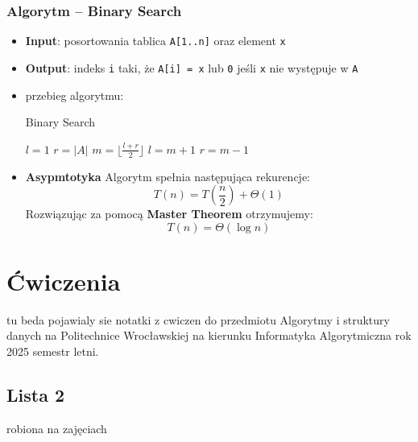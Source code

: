 \documentclass[11pt,a4paper]{article}
\begin{document}
\subsubsection*{Algorytm -- Binary Search}
\begin{itemize}
    \item \textbf{Input}: posortowania tablica \texttt{A[1..n]} oraz element \texttt{x}
    \item \textbf{Output}: indeks \texttt{i} taki, że \texttt{A[i] = x} lub \texttt{0} jeśli \texttt{x} nie występuje w \texttt{A}
        \item przebieg algorytmu: %
            \begin{algorithm}[H]
                \caption{Binary Search}
                \begin{algorithmic}[1]
                        \State $l = 1$
                        \State $r = |A|$
                            \State $m = \lfloor \frac{l+r}{2} \rfloor$
                                \State {}
                                \State $l = m + 1$
                            \Else
                                \State $r = m - 1$
                            \EndIf
                        \EndWhile
                        \State {}
                    \EndProcedure
                \end{algorithmic}
            \end{algorithm}
        \item \textbf{Asypmtotyka}
            Algorytm spełnia następująca rekurencje:
            \[
                T(n) = T(\frac{n}{2}) + \Theta(1)
            \]
            Rozwiązując za pomocą \textbf{Master Theorem} otrzymujemy:
            \[
                T(n) = \Theta(\log n)
            \]
\end{itemize}
\section{Ćwiczenia}
tu beda pojawialy sie notatki z cwiczen do przedmiotu Algorytmy i struktury danych na Politechnice Wrocławskiej na kierunku Informatyka Algorytmiczna rok 2025 semestr letni.

\subsection{Lista 2}
robiona na zajęciach \date{2025-03-10}
\end{document}
